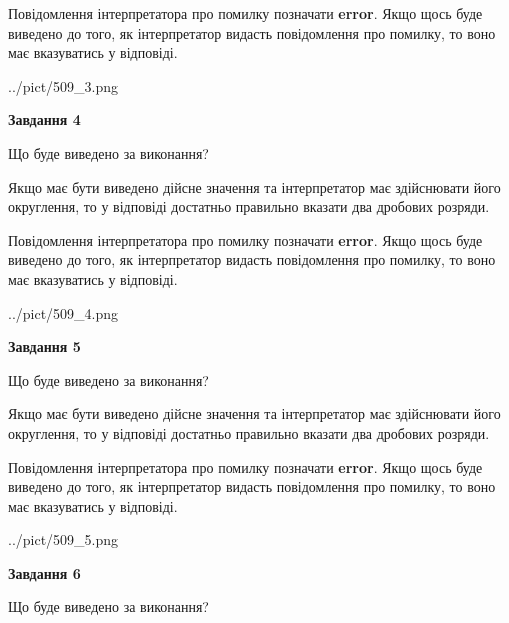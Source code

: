 \documentclass[12pt, ukrainian]{article}
\begin{document}
{\begin {Large}
Повідомлення інтерпретатора про помилку позначати \textbf{error}.
Якщо щось буде виведено до того, як інтерпретатор видасть повідомлення про помилку, 
то воно має вказуватись у відповіді. \par

\begin{center}
	{../pict/509_3.png}
\end{center}
\newpage

{\begin {center}\textbf{Завдання 4}\end {center}}\par
Що буде виведено за виконання? \par

Якщо має бути виведено дійсне значення та інтерпретатор має здійснювати його округлення, 
то у відповіді достатньо правильно вказати два дробових розряди.

Повідомлення інтерпретатора про помилку позначати \textbf{error}.
Якщо щось буде виведено до того, як інтерпретатор видасть повідомлення про помилку, 
то воно має вказуватись у відповіді. \par

\begin{center}
	{../pict/509_4.png}
\end{center}
\newpage

{\begin {center}\textbf{Завдання 5}\end {center}}\par
Що буде виведено за виконання? \par

Якщо має бути виведено дійсне значення та інтерпретатор має здійснювати його округлення, 
то у відповіді достатньо правильно вказати два дробових розряди.

Повідомлення інтерпретатора про помилку позначати \textbf{error}.
Якщо щось буде виведено до того, як інтерпретатор видасть повідомлення про помилку, 
то воно має вказуватись у відповіді. \par

\begin{center}
	{../pict/509_5.png}
\end{center}
\newpage

{\begin {center}\textbf{Завдання 6}\end {center}}\par
Що буде виведено за виконання? \par


\end{Large}}
\end{document}

